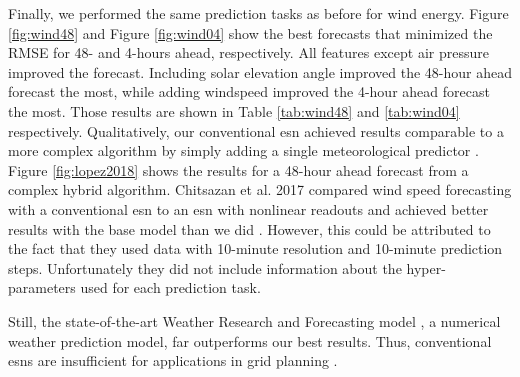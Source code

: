 Finally, we performed the same prediction tasks as before for wind energy.
Figure \ref{fig:wind48} and Figure \ref{fig:wind04} show the best forecasts
that minimized the RMSE for
48- and 4-hours ahead, respectively. All features except air pressure improved
the forecast. Including solar elevation angle improved the 48-hour ahead
forecast the most, while adding windspeed improved the 4-hour ahead forecast
the most. Those results are shown in Table \ref{tab:wind48} and \ref{tab:wind04}
respectively. Qualitatively, our conventional \gls{esn} achieved results
comparable to a more complex algorithm by simply adding a single meteorological
predictor \cite{lopez_wind_2018}. Figure \ref{fig:lopez2018} shows the results for a 48-hour ahead forecast from a complex hybrid algorithm.
Chitsazan et al. 2017 compared wind speed forecasting with a conventional
\gls{esn} to an \gls{esn} with nonlinear readouts and achieved better results
with the base model than we did \cite{chitsazan_wind_2017}. However, this could
be attributed to the fact that they used data with 10-minute resolution and
10-minute prediction steps. Unfortunately they did not include information about
the hyper-parameters used for each prediction task.

Still, the state-of-the-art Weather Research and Forecasting model
\cite{powers_weather_2017}, a numerical weather prediction model, far
outperforms our best results. Thus, conventional \glspl{esn} are insufficient
for applications in grid planning \cite{wang_quantifying_2016}.

